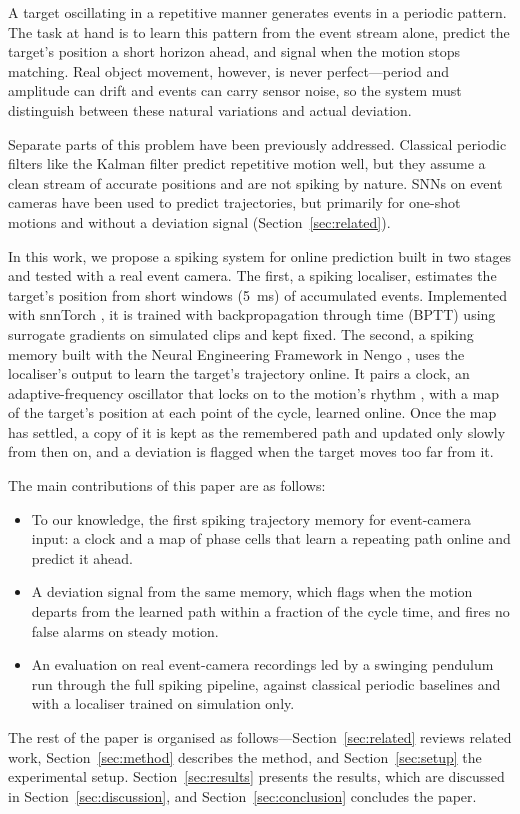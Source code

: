 \documentclass[conference]{IEEEtran}
\begin{document}
A target oscillating in a repetitive manner generates events in a periodic pattern. The task at hand is to learn this pattern from the event stream alone, predict the target's position a short horizon ahead, and signal when the motion stops matching. Real object movement, however, is never perfect---period and amplitude can drift and events can carry sensor noise, so the system must distinguish between these natural variations and actual deviation.

Separate parts of this problem have been previously addressed. Classical periodic filters like the Kalman filter \cite{Kalman1960A} predict repetitive motion well, but they assume a clean stream of accurate positions and are not spiking by nature. SNNs on event cameras have been used to predict trajectories, but primarily for one-shot motions and without a deviation signal (Section~\ref{sec:related}).

In this work, we propose a spiking system for online prediction built in two stages and tested with a real event camera. The first, a spiking localiser, estimates the target's position from short windows (5~ms) of accumulated events. Implemented with snnTorch \cite{Eshraghian2023Training}, it is trained with backpropagation through time (BPTT) using surrogate gradients \cite{Neftci2019Surrogate} on simulated clips and kept fixed. The second, a spiking memory built with the Neural Engineering Framework in Nengo \cite{Eliasmith2003Neural,Bekolay2014Nengo, tsur2021neuromorphic}, uses the localiser's output to learn the target's trajectory online. It pairs a clock, an adaptive-frequency oscillator that locks on to the motion's rhythm \cite{Righetti2006Dynamic, tsur2020neuromorphic}, with a map of the target's position at each point of the cycle, learned online. Once the map has settled, a copy of it is kept as the remembered path and updated only slowly from then on, and a deviation is flagged when the target moves too far from it.

The main contributions of this paper are as follows:
\begin{itemize}
\item To our knowledge, the first spiking trajectory memory for event-camera input: a clock and a map of phase cells that learn a repeating path online and predict it ahead.
\item A deviation signal from the same memory, which flags when the motion departs from the learned path within a fraction of the cycle time, and fires no false alarms on steady motion.
\item An evaluation on real event-camera recordings led by a swinging pendulum run through the full spiking pipeline, against classical periodic baselines and with a localiser trained on simulation only.
\end{itemize}
The rest of the paper is organised as follows---Section~\ref{sec:related} reviews related work, Section~\ref{sec:method} describes the method, and Section~\ref{sec:setup} the experimental setup. Section~\ref{sec:results} presents the results, which are discussed in Section~\ref{sec:discussion}, and Section~\ref{sec:conclusion} concludes the paper.
\end{document}
